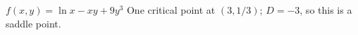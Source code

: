 {$f(x,y) = \ln x - xy + 9y^3$
}
{
One critical point at $(3,1/3)$; $D = -3$, so this is a saddle point.
}